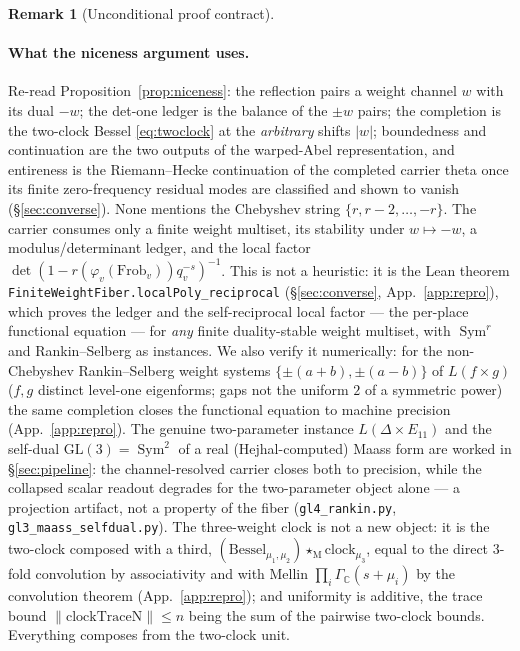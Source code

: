 \documentclass[11pt]{article}
\theoremstyle{definition}
\newtheorem{remark}[theorem]{Remark}
\newcommand{\Sym}{\operatorname{Sym}}
\begin{document}
\begin{remark}[Unconditional proof contract]
\begin{enumerate}
\paragraph{What the niceness argument uses.} Re-read Proposition~\ref{prop:niceness}: the reflection
pairs a weight channel $w$ with its dual $-w$; the det-one ledger is the balance of the $\pm w$ pairs;
the completion is the two-clock Bessel \eqref{eq:twoclock} at the \emph{arbitrary} shifts $|w|$;
boundedness and continuation are the two outputs of the warped-Abel representation, and entireness is the
Riemann--Hecke continuation of the completed carrier theta once its finite zero-frequency residual modes
are classified and shown to vanish (\S\ref{sec:converse}). None mentions the
Chebyshev string $\{r,r-2,\dots,-r\}$. The carrier consumes only a finite weight multiset, its stability
under $w\mapsto-w$, a modulus/determinant ledger, and the local factor
$\det(1-r(\varphi_v(\mathrm{Frob}_v))q_v^{-s})^{-1}$. This is not a heuristic: it is the Lean theorem
\texttt{FiniteWeightFiber.localPoly\_reciprocal} (\S\ref{sec:converse}, App.~\ref{app:repro}), which proves
the ledger and the self-reciprocal local factor --- the per-place functional equation --- for \emph{any}
finite duality-stable weight multiset, with $\Sym^r$ and Rankin--Selberg as instances. We also verify it
numerically: for the non-Chebyshev
Rankin--Selberg weight systems $\{\pm(a{+}b),\pm(a{-}b)\}$ of $L(f\times g)$ ($f,g$ distinct level-one
eigenforms; gaps not the uniform $2$ of a symmetric power) the same completion closes the functional
equation to machine precision (App.~\ref{app:repro}). The genuine two-parameter instance $L(\Delta\times E_{11})$
and the self-dual $\mathrm{GL}(3)=\Sym^2$ of a real (Hejhal-computed) Maass form are worked in
\S\ref{sec:pipeline}: the channel-resolved carrier closes both to precision, while the collapsed scalar readout
degrades for the two-parameter object alone --- a projection artifact, not a property of the fiber
(\texttt{gl4\_rankin.py}, \texttt{gl3\_maass\_selfdual.py}). The three-weight clock is not a new object: it is
the two-clock composed with a third, $(\text{Bessel}_{\mu_1,\mu_2})\star_{\mathrm M}\text{clock}_{\mu_3}$,
equal to the direct $3$-fold convolution by associativity and with Mellin $\prod_i\Gamma_{\mathbb C}(s+
\mu_i)$ by the convolution theorem (App.~\ref{app:repro}); and uniformity is additive, the trace bound
$\|\mathrm{clockTraceN}\|\le n$ being the sum of the pairwise two-clock bounds. Everything composes from
the two-clock unit.


\end{enumerate}
\end{remark}
\end{document}
